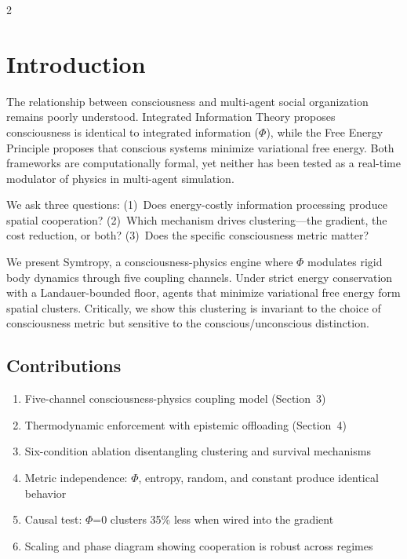 \documentclass[letterpaper]{article}
\begin{document}
\begin{multicols}{2}

\section{Introduction}

The relationship between consciousness and multi-agent social organization remains poorly understood. Integrated Information Theory \citep{tononi2004} proposes consciousness is identical to integrated information ($\Phi$), while the Free Energy Principle \citep{friston2010} proposes that conscious systems minimize variational free energy. Both frameworks are computationally formal, yet neither has been tested as a real-time modulator of physics in multi-agent simulation.

We ask three questions: (1)~Does energy-costly information processing produce spatial cooperation? (2)~Which mechanism drives clustering---the gradient, the cost reduction, or both? (3)~Does the specific consciousness metric matter?

We present Symtropy, a consciousness-physics engine where $\Phi$ modulates rigid body dynamics through five coupling channels. Under strict energy conservation with a Landauer-bounded floor, agents that minimize variational free energy form spatial clusters. Critically, we show this clustering is invariant to the choice of consciousness metric but sensitive to the conscious/unconscious distinction.

\subsection{Contributions}

\begin{enumerate}
\item Five-channel consciousness-physics coupling model (Section~3)
\item Thermodynamic enforcement with epistemic offloading (Section~4)
\item Six-condition ablation disentangling clustering and survival mechanisms
\item Metric independence: $\Phi$, entropy, random, and constant produce identical behavior
\item Causal test: $\Phi$=0 clusters 35\% less when wired into the gradient
\item Scaling and phase diagram showing cooperation is robust across regimes
\end{enumerate}


\end{multicols}
\end{document}
